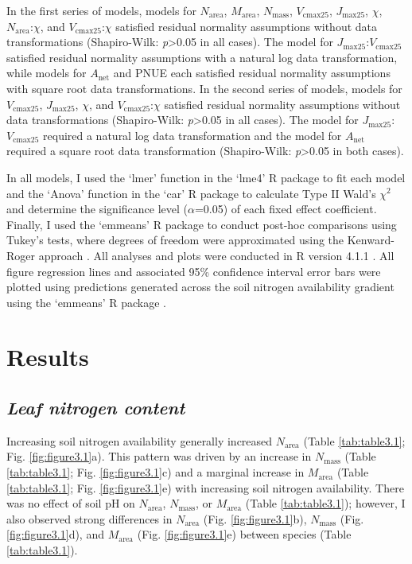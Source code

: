 In the first series of models, models for $N_\mathrm{area}$, $M_\mathrm{area}$, $N_\mathrm{mass}$, $V_\mathrm{cmax25}$, $J_\mathrm{max25}$, $\chi$, $N_{\mathrm{area}}$:$\chi$, and $V_\mathrm{cmax25}$:$\chi$ satisfied residual normality assumptions without data transformations (Shapiro-Wilk: \textit{p}>0.05 in all cases). The model for $J_\mathrm{max25}$:$V_\mathrm{cmax25}$ satisfied residual normality assumptions with a natural log data transformation, while models for $A_\mathrm{net}$ and PNUE each satisfied residual normality assumptions with square root data transformations. In the second series of models, models for $V_\mathrm{cmax25}$, $J_\mathrm{max25}$, $\chi$, and $V_\mathrm{cmax25}$:$\chi$ satisfied residual normality assumptions without data transformations (Shapiro-Wilk: \textit{p}>0.05 in all cases). The model for $J_\mathrm{max25}$:$V_\mathrm{cmax25}$ required a natural log data transformation and the model for $A_\mathrm{net}$ required a square root data transformation (Shapiro-Wilk: \textit{p}>0.05 in both cases).
    
In all models, I used the `lmer' function in the `lme4' R package  to fit each model and the `Anova' function in the `car' R package  to calculate Type II Wald’s $\chi^2$ and determine the significance level ($\alpha$=0.05) of each fixed effect coefficient. Finally, I used the `emmeans' R package  to conduct post-hoc comparisons using Tukey’s tests, where degrees of freedom were approximated using the Kenward-Roger approach . All analyses and plots were conducted in R version 4.1.1 . All figure regression lines and associated 95\% confidence interval error bars were plotted using predictions generated across the soil nitrogen availability gradient using the `emmeans' R package .
    
\section{Results}
\subsection{\textit{Leaf nitrogen content}}  
\noindent Increasing soil nitrogen availability generally increased $N_\mathrm{area}$ (Table \ref{tab:table3.1}; Fig. \ref{fig:figure3.1}a). This pattern was driven by an increase in $N_\mathrm{mass}$ (Table \ref{tab:table3.1}; Fig. \ref{fig:figure3.1}c) and a marginal increase in $M_\mathrm{area}$ (Table \ref{tab:table3.1}; Fig. \ref{fig:figure3.1}e) with increasing soil nitrogen availability. There was no effect of soil pH on $N_\mathrm{area}$, $N_\mathrm{mass}$, or $M_\mathrm{area}$ (Table \ref{tab:table3.1}); however, I also observed strong differences in $N_\mathrm{area}$ (Fig. \ref{fig:figure3.1}b), $N_\mathrm{mass}$ (Fig. \ref{fig:figure3.1}d), and $M_\mathrm{area}$ (Fig. \ref{fig:figure3.1}e) between species (Table \ref{tab:table3.1}).
    \clearpage

